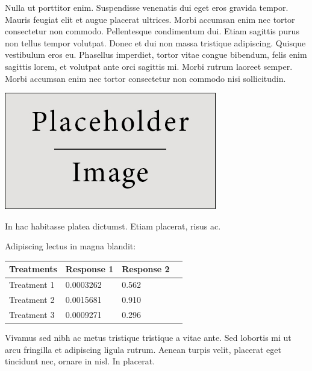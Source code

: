 \documentclass[a0,portrait]{a0poster}
\begin{document}
\begin{multicols}{2}
Nulla ut porttitor enim. Suspendisse venenatis dui eget eros gravida tempor. Mauris feugiat elit et augue placerat ultrices. Morbi accumsan enim nec tortor consectetur non commodo. Pellentesque condimentum dui. Etiam sagittis purus non tellus tempor volutpat. Donec et dui non massa tristique adipiscing. Quisque vestibulum eros eu. Phasellus imperdiet, tortor vitae congue bibendum, felis enim sagittis lorem, et volutpat ante orci sagittis mi. Morbi rutrum laoreet semper. Morbi accumsan enim nec tortor consectetur non commodo nisi sollicitudin.

\begin{center}\vspace{1cm}
\includegraphics[width=0.8\linewidth]{placeholder}
\end{center}\vspace{1cm}

In hac habitasse platea dictumst. Etiam placerat, risus ac.

Adipiscing lectus in magna blandit:

\begin{center}\vspace{1cm}
\begin{tabular}{l l l l}
\toprule
\textbf{Treatments} & \textbf{Response 1} & \textbf{Response 2} \\
\midrule
Treatment 1 & 0.0003262 & 0.562 \\
Treatment 2 & 0.0015681 & 0.910 \\
Treatment 3 & 0.0009271 & 0.296 \\
\bottomrule
\end{tabular}
\end{center}\vspace{1cm}

Vivamus sed nibh ac metus tristique tristique a vitae ante. Sed lobortis mi ut arcu fringilla et adipiscing ligula rutrum. Aenean turpis velit, placerat eget tincidunt nec, ornare in nisl. In placerat.


\end{multicols}
\end{document}
